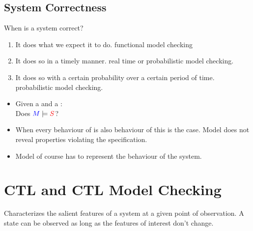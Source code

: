 \documentclass[a4paper, 10pt]{article}
\begin{document}
\subsection{System Correctness}
When is a system correct?
\begin{enumerate}
    \item It does what we expect it to do. \follows functional model checking
    \item It does so in a timely manner. \follows real time or probabilistic model checking.
    \item It does so with a certain probability over a certain period of time. \follows probabilistic model checking.
\end{enumerate}

\begin{minipage}[t]{3cm}
\begin{center}
\scalebox{1}{}
\end{center}
\end{minipage}
\begin{minipage}[t]{12cm}
\begin{itemize}
    \item Given a  and a : \\ Does $\textcolor{blue}{M}\models\textcolor{red}{S}$?
    \item When every behaviour of  is also behaviour of  this is the case. \follows Model does not reveal properties violating the specification.
    \item Model of course has to represent the behaviour of the system.
\end{itemize}
\end{minipage}

\section{CTL and CTL Model Checking}
\begin{mdframed}[roundcorner=5pt,
subtitlebelowline=false,subtitleaboveline=false,
subtitlebackgroundcolor=blue!50,
frametitlerule=true,
frametitlebackgroundcolor=blue!50,
frametitle={State}
]
Characterizes the salient features of a system at a given point of observation. \follows A state can be observed as long as the features of interest don't change.
\end{mdframed}
\end{document}
